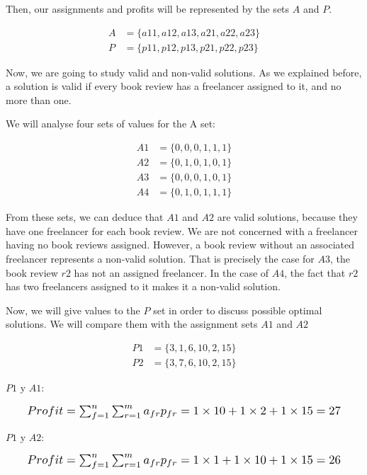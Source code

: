 Then, our assignments and profits will be represented by the sets $A$ and $P$.

\begin{align}
    A &= \{ a11, a12, a13, a21, a22, a23 \} \\
    P &= \{ p11, p12, p13, p21, p22, p23 \}
\end{align}

Now, we are going to study valid and non-valid solutions. As we explained before, a solution is valid if every book review has a freelancer assigned to it, and no more than one.

We will analyse four sets of values for the A set:

\begin{align}
    A1 &= \{ 0, 0, 0, 1, 1, 1 \} \\
    A2 &= \{ 0, 1, 0, 1, 0, 1 \} \\
    A3 &= \{ 0, 0, 0, 1, 0, 1 \} \\
    A4 &= \{ 0, 1, 0, 1, 1, 1 \}
\end{align}

From these sets, we can deduce that $A1$ and $A2$ are valid solutions, because they have one freelancer for each book review. We are not concerned with a freelancer having no book reviews assigned. However, a book review without an associated freelancer represents a non-valid solution. That is precisely the case for $A3$, the book review $r2$ has not an assigned freelancer. In the case of $A4$, the fact that $r2$ has two freelancers assigned to it makes it a non-valid solution.

Now, we will give values to the $P$ set in order to discuss possible optimal solutions. We will compare them with the assignment sets $A1$ and $A2$

\begin{align}
    P1 &= \{ 3, 1, 6, 10, 2, 15 \} \\
    P2 &= \{ 3, 7, 6, 10, 2, 15 \}
\end{align}

$P1$ y $A1$:

\begin{equation}
    \scalebox{1.2}{$Profit = \sum_{f=1}^n \sum_{r=1}^m a_{fr} p_{fr} = 1 \times 10 + 1 \times 2 + 1 \times 15 = 27$}
\end{equation}

$P1$ y $A2$:

\begin{equation}
    \scalebox{1.2}{$Profit = \sum_{f=1}^n \sum_{r=1}^m a_{fr} p_{fr} = 1 \times 1 + 1 \times 10 + 1 \times 15 = 26$}
\end{equation}

